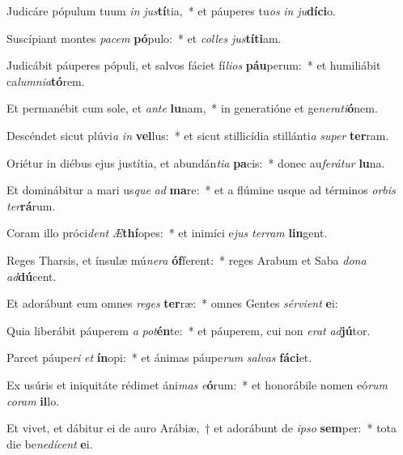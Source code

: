 \item Judicáre pópulum tuum \textit{in} \textit{jus}\textbf{tí}tia,~* et páuperes tu\textit{os} \textit{in} \textit{ju}\textbf{dí}\textbf{ci}o.
\item Suscípiant montes \textit{pa}\textit{cem} \textbf{pó}pulo:~* et \textit{col}\textit{les} \textit{jus}\textbf{tí}\textbf{ti}am.
\item Judicábit páuperes pópuli, et salvos fáciet fí\textit{li}\textit{os} \textbf{páu}perum:~* et humiliábit ca\textit{lum}\textit{ni}\textit{a}\textbf{tó}rem.
\item Et permanébit cum sole, et \textit{an}\textit{te} \textbf{lu}nam,~* in generatióne et ge\textit{ne}\textit{ra}\textit{ti}\textbf{ó}nem.
\item Descéndet sicut plúvi\textit{a} \textit{in} \textbf{vel}lus:~* et sicut stillicídia stillánti\textit{a} \textit{su}\textit{per} \textbf{ter}ram.
\item Oriétur in diébus ejus justítia, et abundán\textit{ti}\textit{a} \textbf{pa}cis:~* donec au\textit{fe}\textit{rá}\textit{tur} \textbf{lu}na.
\item Et dominábitur a mari us\textit{que} \textit{ad} \textbf{ma}re:~* et a flúmine usque ad términos \textit{or}\textit{bis} \textit{ter}\textbf{rá}rum.
\item Coram illo próci\textit{dent} \textit{Æ}\textbf{thí}opes:~* et inimíci e\textit{jus} \textit{ter}\textit{ram} \textbf{lin}gent.
\item Reges Tharsis, et ínsulæ mú\textit{ne}\textit{ra} \textbf{óf}ferent:~* reges Arabum et Saba \textit{do}\textit{na} \textit{ad}\textbf{dú}cent.
\item Et adorábunt eum omnes \textit{re}\textit{ges} \textbf{ter}ræ:~* omnes Gentes \textit{sér}\textit{vi}\textit{ent} \textbf{e}i:
\item Quia liberábit páuperem \textit{a} \textit{pot}\textbf{én}te:~* et páuperem, cui non \textit{e}\textit{rat} \textit{ad}\textbf{jú}tor.
\item Parcet páupe\textit{ri} \textit{et} \textbf{ín}opi:~* et ánimas páupe\textit{rum} \textit{sal}\textit{vas} \textbf{fá}\textbf{ci}et.
\item Ex usúris et iniquitáte rédimet áni\textit{mas} \textit{e}\textbf{ó}rum:~* et honorábile nomen eó\textit{rum} \textit{co}\textit{ram} \textbf{il}lo.
\item Et vivet, et dábitur ei de auro Arábiæ,~† et adorábunt de \textit{ip}\textit{so} \textbf{sem}per:~* tota die be\textit{ne}\textit{dí}\textit{cent} \textbf{e}i.
